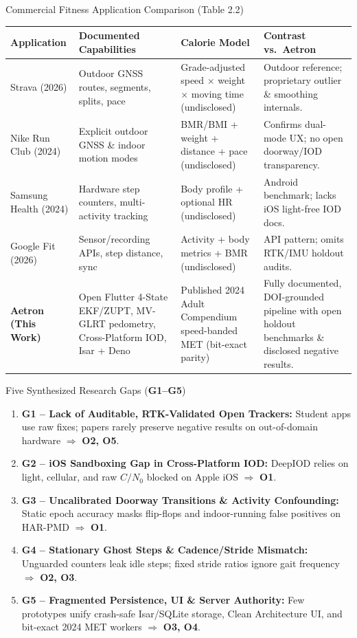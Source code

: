 \documentclass[aspectratio=169,10pt]{beamer}
\begin{document}
\begin{frame}{Commercial Fitness Application Comparison (Table 2.2)}
  \centering\scriptsize
  \renewcommand{\arraystretch}{1.28}
  \begin{tabular}{@{}p{2.1cm}p{3.8cm}p{3.3cm}p{3.9cm}@{}}
    \toprule
    \textbf{Application} & \textbf{Documented Capabilities} & \textbf{Calorie Model} & \textbf{Contrast vs.\ Aetron} \\ \midrule
    Strava (2026) & Outdoor GNSS routes, segments, splits, pace & Grade-adjusted speed $\times$ weight $\times$ moving time (undisclosed) & Outdoor reference; proprietary outlier \& smoothing internals. \\
    Nike Run Club (2024) & Explicit outdoor GNSS \& indoor motion modes & BMR/BMI + weight + distance + pace (undisclosed) & Confirms dual-mode UX; no open doorway/IOD transparency. \\
    Samsung Health (2024) & Hardware step counters, multi-activity tracking & Body profile + optional HR (undisclosed) & Android benchmark; lacks iOS light-free IOD docs. \\
    Google Fit (2026) & Sensor/recording APIs, step distance, sync & Activity + body metrics + BMR (undisclosed) & API pattern; omits RTK/IMU holdout audits. \\ \midrule
    \textbf{Aetron (This Work)} & Open Flutter 4-State EKF/ZUPT, MV-GLRT pedometry, Cross-Platform IOD, Isar + Deno & Published 2024 Adult Compendium speed-banded MET (bit-exact parity) & Fully documented, DOI-grounded pipeline with open holdout benchmarks \& disclosed negative results. \\ \bottomrule
  \end{tabular}
\end{frame}

\begin{frame}{Five Synthesized Research Gaps (\textbf{G1--G5})}
  \small
  \begin{enumerate}\itemsep 6pt
    \item \textbf{G1 -- Lack of Auditable, RTK-Validated Open Trackers:} Student apps use raw fixes; papers rarely preserve negative results on out-of-domain hardware $\Rightarrow$ \textbf{O2, O5}.
    \item \textbf{G2 -- iOS Sandboxing Gap in Cross-Platform IOD:} DeepIOD relies on light, cellular, and raw $C/N_0$ blocked on Apple iOS $\Rightarrow$ \textbf{O1}.
    \item \textbf{G3 -- Uncalibrated Doorway Transitions \& Activity Confounding:} Static epoch accuracy masks flip-flops and indoor-running false positives on HAR-PMD $\Rightarrow$ \textbf{O1}.
    \item \textbf{G4 -- Stationary Ghost Steps \& Cadence/Stride Mismatch:} Unguarded counters leak idle steps; fixed stride ratios ignore gait frequency $\Rightarrow$ \textbf{O2, O3}.
    \item \textbf{G5 -- Fragmented Persistence, UI \& Server Authority:} Few prototypes unify crash-safe Isar/SQLite storage, Clean Architecture UI, and bit-exact 2024 MET workers $\Rightarrow$ \textbf{O3, O4}.
  \end{enumerate}
\end{frame}
\end{document}
